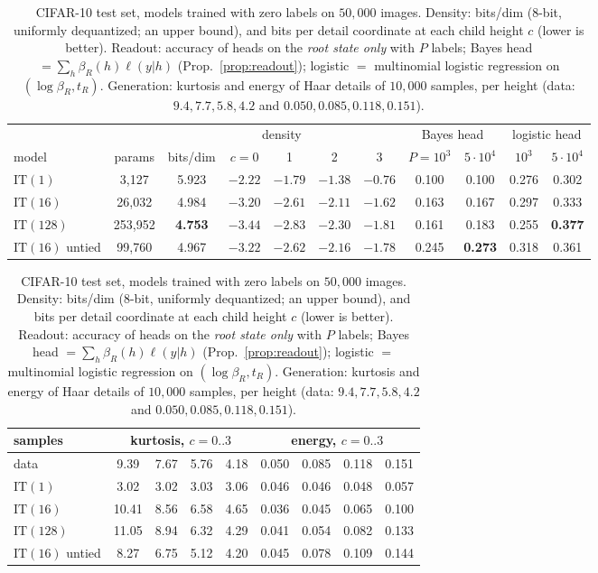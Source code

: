 \documentclass[11pt]{article}
\theoremstyle{definition}
\begin{document}
\begin{table}[h]\centering
\caption{CIFAR-10 test set, models trained with zero labels on $50{,}000$ images. Density: bits/dim (8-bit,
uniformly dequantized; an upper bound), and bits per detail coordinate at each child height $c$ (lower is better).
Readout: accuracy of heads on the \emph{root state only} with $P$ labels; Bayes head $=\sum_h\beta_R(h)\ell(y|h)$
(Prop.~\ref{prop:readout}); logistic $=$ multinomial logistic regression on $(\log\beta_R,t_R)$.
Generation: kurtosis and energy of Haar details of $10{,}000$ samples, per height (data: $9.4,7.7,5.8,4.2$ and
$0.050,0.085,0.118,0.151$).}\label{tab:cifarmain}
\small\begin{tabular}{l|c|ccccc|cc|cc}\toprule
& & \multicolumn{5}{c|}{density} & \multicolumn{2}{c|}{Bayes head} & \multicolumn{2}{c}{logistic head}\\
model & params & bits/dim & $c{=}0$ & 1 & 2 & 3 & $P{=}10^3$ & $5{\cdot}10^4$ & $10^3$ & $5{\cdot}10^4$\\\midrule
$\mathrm{IT}(1)$ & 3,127 & 5.923 & $-2.22$ & $-1.79$ & $-1.38$ & $-0.76$ & 0.100 & 0.100 & 0.276 & 0.302\\
$\mathrm{IT}(16)$ & 26,032 & 4.984 & $-3.20$ & $-2.61$ & $-2.11$ & $-1.62$ & 0.163 & 0.167 & 0.297 & 0.333\\
$\mathrm{IT}(128)$ & 253,952 & \textbf{4.753} & $-3.44$ & $-2.83$ & $-2.30$ & $-1.81$ & 0.161 & 0.183 & 0.255 & \textbf{0.377}\\
$\mathrm{IT}(16)$ untied & 99,760 & 4.967 & $-3.22$ & $-2.62$ & $-2.16$ & $-1.78$ & 0.245 & \textbf{0.273} & 0.318 & 0.361\\
\bottomrule\end{tabular}

\medskip
\begin{tabular}{l|cccc|cccc}\toprule
samples & \multicolumn{4}{c|}{kurtosis, $c=0..3$} & \multicolumn{4}{c}{energy, $c=0..3$}\\\midrule
data & 9.39 & 7.67 & 5.76 & 4.18 & 0.050 & 0.085 & 0.118 & 0.151\\
$\mathrm{IT}(1)$ & 3.02 & 3.02 & 3.03 & 3.06 & 0.046 & 0.046 & 0.048 & 0.057\\
$\mathrm{IT}(16)$ & 10.41 & 8.56 & 6.58 & 4.65 & 0.036 & 0.045 & 0.065 & 0.100\\
$\mathrm{IT}(128)$ & 11.05 & 8.94 & 6.32 & 4.29 & 0.041 & 0.054 & 0.082 & 0.133\\
$\mathrm{IT}(16)$ untied & 8.27 & 6.75 & 5.12 & 4.20 & 0.045 & 0.078 & 0.109 & 0.144\\
\bottomrule\end{tabular}
\end{table}
\end{document}
